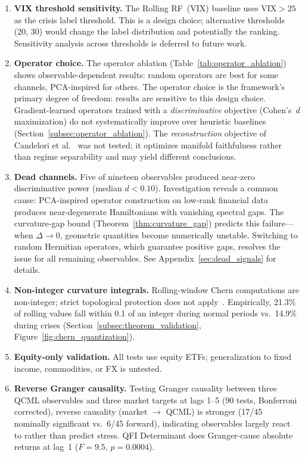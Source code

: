 \documentclass[3p]{elsarticle}
\begin{document}
\begin{enumerate}
\item \textbf{VIX threshold sensitivity.}
  The Rolling RF~(VIX) baseline uses $\text{VIX} > 25$ as the crisis
  label threshold.  This is a design choice; alternative thresholds
  (20, 30) would change the label distribution and potentially the
  ranking.  Sensitivity analysis across thresholds is deferred to
  future work.

\item \textbf{Operator choice.}  The operator ablation
  (Table~\ref{tab:operator_ablation}) shows observable-dependent
  results: random operators are best for some channels, PCA-inspired
  for others.  The operator choice is the framework's primary degree
  of freedom: results are sensitive to this design choice.
  Gradient-learned operators trained with a \emph{discriminative}
  objective (Cohen's~$d$ maximization) do not systematically improve
  over heuristic baselines (Section~\ref{subsec:operator_ablation}).
  The \emph{reconstruction} objective of Candelori et
  al.~\cite{candelori2025} was not tested; it optimizes manifold
  faithfulness rather than regime separability and may yield
  different conclusions.

\item \textbf{Dead channels.}  Five of nineteen observables produced
  near-zero discriminative power (median $d < 0.10$).  Investigation
  reveals a common cause: PCA-inspired operator construction on
  low-rank financial data produces near-degenerate Hamiltonians with
  vanishing spectral gaps.  The curvature-gap bound
  (Theorem~\ref{thm:curvature_gap}) predicts this failure---when
  $\Delta \to 0$, geometric quantities become numerically unstable.
  Switching to random Hermitian operators, which guarantee positive
  gaps, resolves the issue for all remaining observables.  See
  Appendix~\ref{sec:dead_signals} for details.

\item \textbf{Non-integer curvature integrals.}  Rolling-window Chern
  computations are non-integer; strict topological protection does not
  apply~\cite{abanov2025}.  Empirically, 21.3\% of rolling values fall
  within 0.1 of an integer during normal periods vs.\ 14.9\% during
  crises (Section~\ref{subsec:theorem_validation},
  Figure~\ref{fig:chern_quantization}).

\item \textbf{Equity-only validation.}  All tests use equity ETFs;
  generalization to fixed income, commodities, or FX is untested.

\item \textbf{Reverse Granger causality.}  Testing Granger causality
  between three QCML observables and three market targets at lags 1--5
  (90 tests, Bonferroni corrected), reverse causality (market $\to$ QCML)
  is stronger (17/45 nominally significant vs.\ 6/45 forward),
  indicating observables largely react to rather than predict stress.
  QFI Determinant does Granger-cause absolute returns at lag~1
  ($F = 9.5$, $p = 0.0004$).
\end{enumerate}
\end{document}
